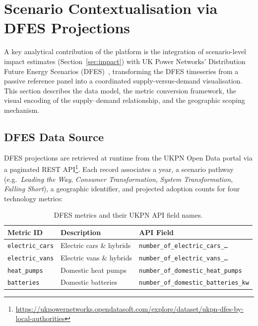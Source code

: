 
\section{Scenario Contextualisation via DFES Projections}
\label{sec:dfes}

A key analytical contribution of the platform is the integration of scenario-level impact estimates (Section~\ref{sec:impact}) with UK Power Networks' Distribution Future Energy Scenarios (DFES)~\cite{ukpn-dfes}, transforming the DFES timeseries from a passive reference panel into a coordinated supply-versus-demand visualisation. This section describes the data model, the metric conversion framework, the visual encoding of the supply--demand relationship, and the geographic scoping mechanism.

\subsection{DFES Data Source}
\label{sec:dfes-data}

DFES projections are retrieved at runtime from the UKPN Open Data portal via a paginated REST API\footnote{\url{https://ukpowernetworks.opendatasoft.com/explore/dataset/ukpn-dfes-by-local-authorities}}. Each record associates a year, a scenario pathway (e.g.\ \emph{Leading the Way}, \emph{Consumer Transformation}, \emph{System Transformation}, \emph{Falling Short}), a geographic identifier, and projected adoption counts for four technology metrics:

\begin{table}[htbp]
\centering
\caption{DFES metrics and their UKPN API field names.}
\label{tab:dfes-metrics}
\small
\begin{tabular}{lll}
\toprule
\textbf{Metric ID} & \textbf{Description} & \textbf{API Field} \\
\midrule
\texttt{electric\_cars} & Electric cars \& hybrids & \texttt{number\_of\_electric\_cars\_\ldots} \\
\texttt{electric\_vans} & Electric vans \& hybrids & \texttt{number\_of\_electric\_vans\_\ldots} \\
\texttt{heat\_pumps} & Domestic heat pumps & \texttt{number\_of\_domestic\_heat\_pumps} \\
\texttt{batteries} & Domestic batteries & \texttt{number\_of\_domestic\_batteries\_kw} \\
\bottomrule
\end{tabular}
\end{table}

